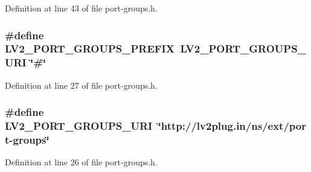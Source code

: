 Definition at line 43 of file port-\/groups.\+h.

\subsubsection[{\texorpdfstring{L\+V2\+\_\+\+P\+O\+R\+T\+\_\+\+G\+R\+O\+U\+P\+S\+\_\+\+P\+R\+E\+F\+IX}{LV2_PORT_GROUPS_PREFIX}}]{\setlength{\rightskip}{0pt plus 5cm}\#define L\+V2\+\_\+\+P\+O\+R\+T\+\_\+\+G\+R\+O\+U\+P\+S\+\_\+\+P\+R\+E\+F\+IX~{\bf L\+V2\+\_\+\+P\+O\+R\+T\+\_\+\+G\+R\+O\+U\+P\+S\+\_\+\+U\+RI} \char`\"{}\#\char`\"{}}\hypertarget{port-groups_8h_ad8eff71f3c96d9bf45282fed8195fde3}{}\label{port-groups_8h_ad8eff71f3c96d9bf45282fed8195fde3}


Definition at line 27 of file port-\/groups.\+h.

\subsubsection[{\texorpdfstring{L\+V2\+\_\+\+P\+O\+R\+T\+\_\+\+G\+R\+O\+U\+P\+S\+\_\+\+U\+RI}{LV2_PORT_GROUPS_URI}}]{\setlength{\rightskip}{0pt plus 5cm}\#define L\+V2\+\_\+\+P\+O\+R\+T\+\_\+\+G\+R\+O\+U\+P\+S\+\_\+\+U\+RI~\char`\"{}http\+://{\bf lv2plug.\+in}/{\bf ns}/ext/port-\/groups\char`\"{}}\hypertarget{port-groups_8h_a3f7ba5ba5b5d58ceb0a694e88c62cf3e}{}\label{port-groups_8h_a3f7ba5ba5b5d58ceb0a694e88c62cf3e}


Definition at line 26 of file port-\/groups.\+h.

